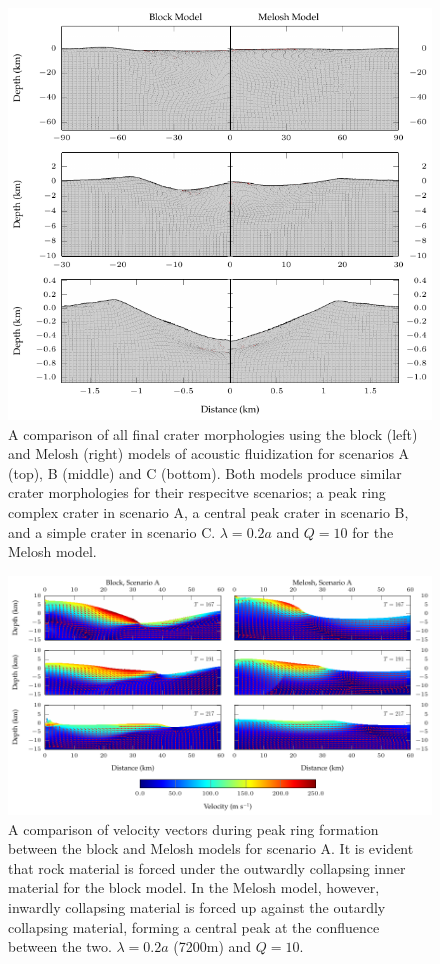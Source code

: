 \begin{figure}[!t]
\centering
\includegraphics[width=0.8\linewidth]{./images/comparison.pdf}
\caption{A comparison of all final crater morphologies using the block (left) and Melosh (right) models of acoustic fluidization for scenarios A (top), B (middle) and C (bottom). Both models produce similar crater morphologies for their respecitve scenarios; a peak ring complex crater in scenario A, a central peak crater in scenario B, and a simple crater in scenario C. $\lambda=0.2a$ and $Q=10$ for the Melosh model. \label{fig:comparison}}
\end{figure}

\begin{figure}[!t]
\centering
\includegraphics[width=\linewidth]{./images/peak_ring.pdf}
\caption{A comparison of velocity vectors during peak ring formation between the block and Melosh models for scenario A. It is evident that rock material is forced under the outwardly collapsing inner material for the block model. In the Melosh model, however, inwardly collapsing material is forced up against the outardly collapsing material, forming a central peak at the confluence between the two. $\lambda=0.2a$ (7200m) and $Q=10$.\label{fig:peak_ring}}
\end{figure}

